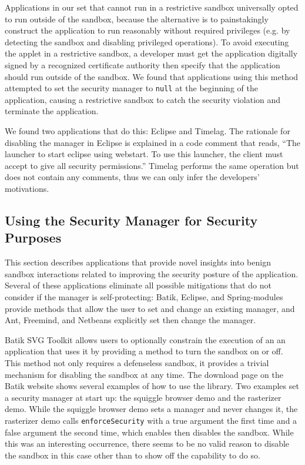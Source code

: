\documentclass{sig-alternate}
\begin{document}
Applications in our set that cannot run in a restrictive sandbox universally
opted to run outside of the sandbox, because the alternative is to painstakingly
construct the application to run reasonably without required privileges (e.g. by
detecting the sandbox and disabling privileged operations). To avoid executing
the applet in a restrictive 
sandbox, a developer must get the application digitally signed
by a recognized certificate authority then specify that the application should
run outside of the sandbox. We found that applications using this method attempted
to set the security manager to \texttt{null} at the beginning of the
application, causing a restrictive sandbox to catch the security violation and
terminate the application.

We found two applications that do this: Eclipse and
Timelag. The rationale for disabling the manager in Eclipse is explained in a
code comment that reads, ``The launcher to start eclipse using webstart. To use
this launcher, the client must accept to give all security permissions.'' Timelag
performs the same operation but does not contain any comments, thus we can only
infer the developers' motivations. 

\subsection{Using the Security Manager for Security Purposes}
\label{sub:Using-the-Security}

This section describes applications that provide novel insights into benign sandbox interactions related to improving the security
posture of the application. Several of these applications eliminate all possible mitigations that do not consider if the manager is self-protecting: Batik, Eclipse, and Spring-modules provide
methods that allow the user to set and change an existing manager,
and Ant, Freemind, and Netbeans explicitly set then change the manager.

Batik SVG Toolkit allows users to optionally constrain the execution of an an application
that uses it by providing a method to turn the sandbox on or off. This method not only requires a defenseless sandbox, it provides a trivial mechanism for disabling the sandbox at any time. The download page on the Batik
website shows several examples of how to use the library. Two examples set
a security manager at start up: the squiggle browser demo and the
rasterizer demo. While the squiggle browser demo sets a manager and
never changes it, the rasterizer demo calls \texttt{enforceSecurity}
with a true argument the first time and a false argument the second
time, which enables then disables the sandbox. While this was an interesting
occurrence, there seems to be no valid reason to disable the sandbox
in this case other than to show off the capability to do so.
\end{document}
